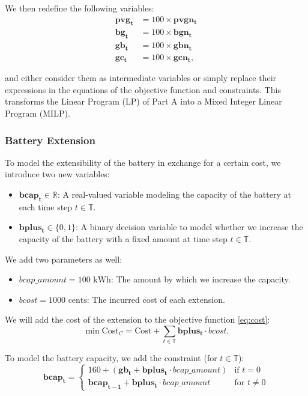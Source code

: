 \documentclass[12pt]{article}
\newcommand{\VAR}[1]{\mathbf{#1}}
\newcommand{\T}{\mathbb{T}}
\begin{document}
We then redefine the following variables:
\begin{align}
    \VAR{pvg_t} &= 100 \times \VAR{pvgn_t} \\
    \VAR{bg_t} &= 100 \times \VAR{bgn_t} \\
    \VAR{gb_t} &= 100 \times \VAR{gbn_t} \\
    \VAR{gc_t} &= 100 \times \VAR{gcn_t},
\end{align}

and either consider them as intermediate variables or simply replace their expressions in the equations of the objective function and constraints. This transforms the Linear Program (LP) of Part A into a Mixed Integer Linear Program (MILP).

\subsubsection{Battery Extension}
To model the extensibility of the battery in exchange for a certain cost, we introduce two new variables:
\begin{itemize}
    \item \(\VAR{bcap_t} \in \mathbb{R}\): A real-valued variable modeling the capacity of the battery at each time step \(t \in \T\).
    \item \(\VAR{bplus_t} \in \{0, 1\}\): A binary decision variable to model whether we increase the capacity of the battery with a fixed amount at time step \(t \in \T\).
\end{itemize}

We add two parameters as well:
\begin{itemize}
    \item \(bcap\_amount = 100 \text{ kWh}\): The amount by which we increase the capacity.
    \item \(bcost = 1000 \text{ cents}\): The incurred cost of each extension.
\end{itemize}

We will add the cost of the extension to the objective function \eqref{eq:cost}:
\begin{equation}
    \min \text{Cost}_C = \text{Cost} + \sum_{t \in \T} \VAR{bplus_t} \cdot bcost.
\end{equation}

To model the battery capacity, we add the constraint (for \(t \in \T\)):
\begin{equation}
    \VAR{bcap_t} =
    \begin{cases}
        160 + (\VAR{gb_t} + \VAR{bplus_t} \cdot bcap\_amount) & \text{if } t = 0 \\
        \VAR{bcap_{t-1}} + \VAR{bplus_t} \cdot bcap\_amount & \text{for } t \neq 0
    \end{cases}
\end{equation}
\end{document}
